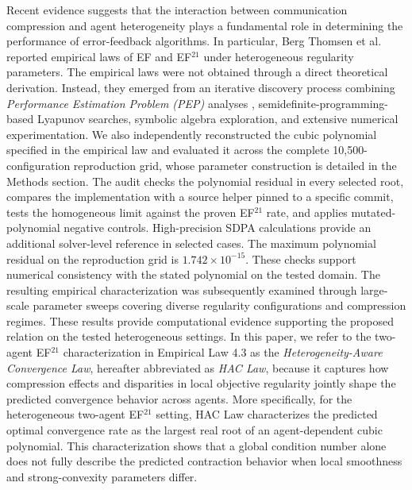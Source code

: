 Recent evidence suggests that the interaction between communication compression
and agent heterogeneity plays a fundamental role in determining the performance
of error-feedback algorithms. In particular, Berg Thomsen et al.
\citep{thomsen2026tight} reported empirical laws of EF and
EF$^{21}$ under heterogeneous regularity parameters. The empirical laws were not obtained through a direct theoretical derivation. Instead, they emerged from an iterative discovery process combining \emph{Performance Estimation Problem (PEP)} analyses \citep{drori2014performance,taylor2017exact}, semidefinite-programming-based Lyapunov searches, symbolic algebra exploration, and extensive numerical experimentation. We also independently reconstructed the cubic polynomial specified in the empirical law and evaluated it across the complete 10,500-configuration reproduction grid, whose parameter construction is detailed in the Methods section. The audit checks the polynomial residual in every selected root, compares the implementation with a source helper pinned to a specific commit, tests the homogeneous limit against the proven EF$^{21}$ rate, and applies mutated-polynomial negative controls. High-precision SDPA calculations provide an additional solver-level reference in selected cases. The maximum polynomial residual on the reproduction grid is $1.742\times10^{-15}$. These checks support numerical consistency with the stated polynomial on the tested domain. The resulting empirical characterization was subsequently examined through large-scale parameter sweeps covering diverse regularity configurations and compression regimes. These results provide computational evidence supporting the proposed relation on the tested heterogeneous settings. In this paper, we refer to the two-agent EF$^{21}$ characterization in Empirical Law 4.3 as the \emph{Heterogeneity-Aware Convergence Law}, hereafter abbreviated as \emph{HAC Law}, because it captures how compression effects and disparities in local objective regularity jointly shape the predicted convergence behavior across agents. More specifically, for the heterogeneous two-agent EF$^{21}$ setting, HAC Law characterizes the predicted optimal convergence rate as the largest real root of an agent-dependent cubic polynomial. This characterization shows that a global condition number alone does not fully describe the predicted contraction behavior when local smoothness and strong-convexity parameters differ. 

 

